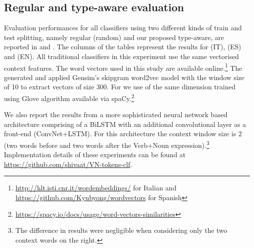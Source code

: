 \documentclass[output=paper,modfonts,nonflat]{langsci/langscibook}
\begin{document}
\subsection{Regular and type-aware evaluation}
\label{sec:res1}
Evaluation performances for all classifiers using two different kinds of train and test splitting, namely regular (random) and our proposed type-aware, are reported in  and .
The columns of the tables represent the results for  (IT),  (ES) and  (EN).
All traditional classifiers in this experiment use the same vectorised context features. 
The word vectors used in this study are available online.\footnote{\url{http://hlt.isti.cnr.it/wordembeddings/} for Italian and \url{https://github.com/Kyubyong/wordvectors} for Spanish} The generated  and   applied Gensim’s skipgram word2vec model with the window size of 10 to extract vectors of size 300.
For  we use  of the same dimension trained using Glove \citep{pennington2014glove} algorithm available via spaCy.\footnote{\url{https://spacy.io/docs/usage/word-vectors-similarities}}

We also report the results from a more sophisticated neural network based architecture comprising of a BiLSTM with an additional convolutional layer as a front-end (ConvNet+LSTM). For this architecture the context window size is $2$ (two words before and two words after the Verb+Noun expression).\footnote{The difference in results were negligible when considering only the two context words on the right.} Implementation details of these experiments can be found at \url{https://github.com/shivaat/VN-tokens-clf}. 
\end{document}
